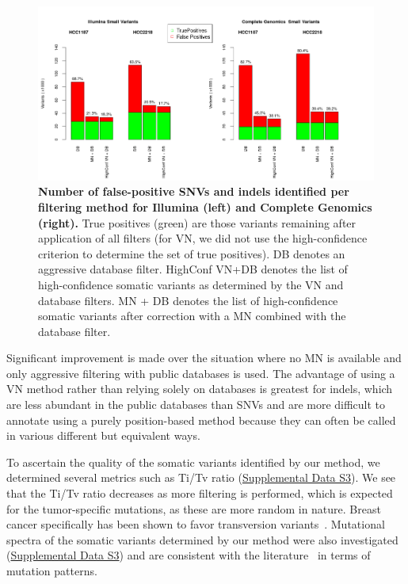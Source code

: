 \begin{figure}[t!]
\centering
\includegraphics[width=\textwidth]{chapters/images/virtualnormal/Hiltemann_Figure2.png}
\caption{\textbf{Number of false-positive SNVs and indels identified per filtering method for Illumina (left) and Complete Genomics (right).} True positives (green) are those variants remaining after application of all filters (for VN, we did not use the high-confidence criterion to determine the set of true positives). DB denotes an aggressive database filter. HighConf VN+DB denotes the list of high-confidence somatic variants as determined by the VN and database filters. MN + DB denotes the list of high-confidence somatic variants after correction with a MN combined with the database filter. }
\label{fig:snvcomparison}
\end{figure}

Significant improvement is made over the situation where no MN is available and only aggressive filtering with public databases is used. The advantage of using a VN method rather than relying solely on databases is greatest for indels, which are less abundant in the public databases than SNVs and are more difficult to annotate using a purely position-based method because they can often be called in various different but equivalent ways.

To ascertain the quality of the somatic variants identified by our method, we determined several metrics such as Ti/Tv ratio (\href{https://genome.cshlp.org/content/25/9/1382/suppl/DC1}{Supplemental Data S3}). We see that the Ti/Tv ratio decreases as more filtering is performed, which is expected for the tumor-specific mutations, as these are more random in nature. Breast cancer specifically has been shown to favor transversion variants~\cite{liu2002genetic}. Mutational spectra of the somatic variants determined by our method were also investigated (\href{https://genome.cshlp.org/content/25/9/1382/suppl/DC1}{Supplemental Data S3}) and are consistent with the literature~\cite{rubin2009mutation} in terms of mutation patterns.

